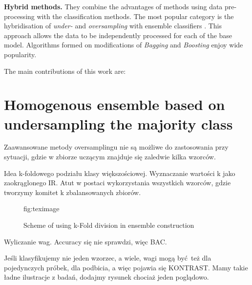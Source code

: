 \documentclass[pmlr]{jmlr}
\begin{document}
\noindent\textbf{Hybrid methods.} They combine the advantages of methods using data pre-processing with the classification methods. The most popular category is the hybridisation of \emph{under-} and \emph{oversampling} with ensemble classifiers \cite{Galar:2012}. This approach allows the data to be independently  processed for each of the base model. Algorithms formed on modifications of \emph{Bagging} and \emph{Boosting} \cite{Chawla:2003} enjoy wide popularity.

The main contributions of this work are:

\section{Homogenous ensemble based on undersampling the majority class}
\label{sec:intro}

Zaawansowane metody oversamplingu nie są możliwe do zastosowania przy sytuacji, gdzie w zbiorze uczącym znajduje się zaledwie kilka wzorców.

Idea k-foldowego podziału klasy większościowej. Wyznaczanie wartości k jako zaokrąglonego IR. Atut w postaci wykorzystania wszystkich wzorców, gdzie tworzymy komitet k zbalansowanych zbiorów.

\begin{figure}[htbp]
\floatconts
  {fig:teximage}
  {\caption{Scheme of using k-Fold division in ensemble construction}}
  {}
\end{figure}

Wyliczanie wag. Accuracy się nie sprawdzi, więc BAC.

Jeśli klasyfikujemy nie jeden wzorzec, a wiele, wagi mogą być też dla pojedynczych próbek, dla podbicia, a więc pojawia się KONTRAST. Mamy takie ładne ilustracje z badań, dodajmy rysunek chociaż jeden poglądowo.
\end{document}

